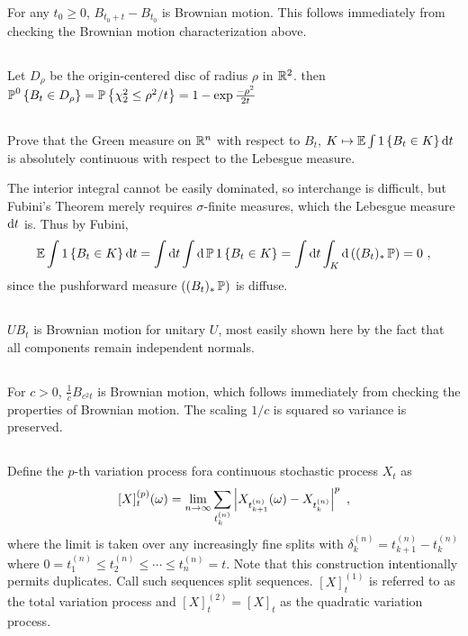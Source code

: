 \documentclass{article}
\begin{document}
       For any \(t_0\ge 0\), \(B_{t_0+t}-B_{t_0}\) is Brownian motion. This follows immediately from checking the Brownian motion characterization above.

       \subsection{}
       Let \(D_\rho\) be the origin-centered disc of radius \(\rho\) in \(\mathbb{R}^2\). then \(\operatorname{\mathbb{P}}^0\left\{{B_t\in D_\rho }\right\}=\operatorname{\mathbb{P}}\left\{{\chi^2_2\le \rho^2/t}\right\}=1-\exp\frac{-\rho^2}{2t}\)

       \subsection{}
       Prove that the Green measure on \(\mathbb{R}^n\) with respect to \(B_t\), \(K\mapsto\operatorname{\mathbb{E}}\int 1\left\{{B_t\in K}\right\}\mathop{\mathrm{d} t }\) is absolutely continuous with respect to the Lebesgue measure.

       The interior integral cannot be easily dominated, so interchange is difficult, but Fubini's Theorem merely requires \(\sigma\)-finite measures, which the Lebesgue measure \(\mathop{\mathrm{d} t }\) is. Thus by Fubini,
       \[
         \operatorname{\mathbb{E}}\int 1\left\{{B_t\in K}\right\}\mathop{\mathrm{d} t }=\int \mathop{\mathrm{d} t }\int \mathop{\mathrm{d} \operatorname{\mathbb{P}} } 1\left\{{B_t\in K}\right\}=\int \mathop{\mathrm{d} t }\int_K \mathop{\mathrm{d} \left({(B_t)_*\operatorname{\mathbb{P}}}\right) } =0\,\,,
       \]
       since the pushforward measure \(\left({(B_t)_*\operatorname{\mathbb{P}}}\right)\) is diffuse.

       \subsection{}

       \(UB_t\) is Brownian motion for unitary \(U\), most easily shown here by the fact that all components remain independent normals.

       \subsection{}

       For \(c>0\), \(\frac{1}{c}B_{c^2t}\) is Brownian motion, which follows immediately from checking the properties of Brownian motion. The scaling \(1/c\) is squared so variance is preserved.
       \subsection{}

       Define the \(p\)-th variation process fora continuous stochastic process \(X_t\) as
       \[
         [X]_t^{(p)}(\omega)=\lim_{n\rightarrow\infty}\sum_{t_k^{(n)}}\left\lvert{X_{t_{k+1}^{(n)}}(\omega)-X_{t_k^{(n)}}}\right\rvert^p\,\,,
       \]
       where the limit is taken over any increasingly fine splits with \(\delta_k^{(n)}=t_{k+1}^{(n)}-t_{k}^{(n)}\) where \(0= t_1^{(n)} \le t_2^{(n)}\le\cdots\le  t_n^{(n)}=t\). Note that this construction intentionally permits duplicates. Call such sequences split sequences.
       \([X]_t^{(1)}\) is referred to as the total variation process and \([X]_t^{(2)}=[X]_t\) as the quadratic variation process.
\end{document}
